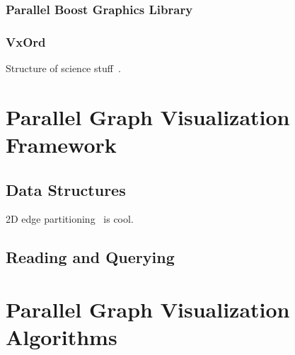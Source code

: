 \documentclass[pdf,12pt,report,strict]{SANDreport}
\newcommand*{\lcite}[1]{~\cite{#1}}
\begin{document}

\subsection{Parallel Boost Graphics Library}
\label{sec:RelatedProjects:PBGL}



\subsection{VxOrd}
\label{sec:RelatedProjects:VxOrd}


Structure of science stuff\lcite{Boyak04,Boyak05}.



\chapter{Parallel Graph Visualization Framework}
\label{sec:ParallelGraphVisualizationFramework}

\section{Data Structures}
\label{sec:ParallelGraphVisualizationFramework:DataStructures}



2D edge partitioning\lcite{Yoo05} is cool.


\section{Reading and Querying}
\label{sec:ParallelGraphVisualizationFramework:ReadingAndQuerying}


\chapter{Parallel Graph Visualization Algorithms}
\label{chap:ParallelGraphVisualizationAlgorithms}
\end{document}
